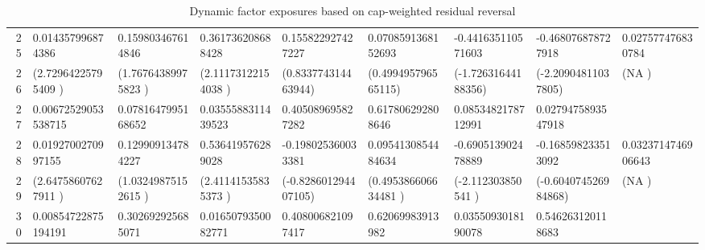 \begin{table}[ht]
\begin{tabular}{rllllllll}
  25 & 0.014357996874386 & 0.159803467614846 & 0.361736208688428 & 0.155822927427227 & 0.0708591368152693 & -0.441635110571603 & -0.468076878727918 & 0.027577476830784 \\ 
  26 & (2.72964225795409 ) & (1.76764389975823 ) & (2.11173122154038 ) & (0.833774314463944) & (0.499495796565115) & (-1.72631644188356) & (-2.20904811037805) & (NA               ) \\ 
  27 & 0.00672529053538715 & 0.0781647995168652 & 0.0355588311439523 & 0.405089695827282 & 0.617806292808646 & 0.0853482178712991 & 0.0279475893547918 &  \\ 
  28 & 0.0192700270997155 & 0.129909134784227 & 0.536419576289028 & -0.198025360033381 & 0.0954130854484634 & -0.690513902478889 & -0.168598233513092 & 0.0323714746906643 \\ 
  29 & (2.64758607627911  ) & (1.03249875152615  ) & (2.41141535835373  ) & (-0.828601294407105) & (0.495386606634481 ) & (-2.112303850541   ) & (-0.604074526984868) & (NA                ) \\ 
  30 & 0.00854722875194191 & 0.302692925685071 & 0.0165079350082771 & 0.408006821097417 & 0.62069983913982 & 0.0355093018190078 & 0.546263120118683 &  \\ 
   \hline
\end{tabular}
\caption{Dynamic factor exposures based on cap-weighted residual reversal} 
\label{tab:ParmResRevCap}
\end{table}
